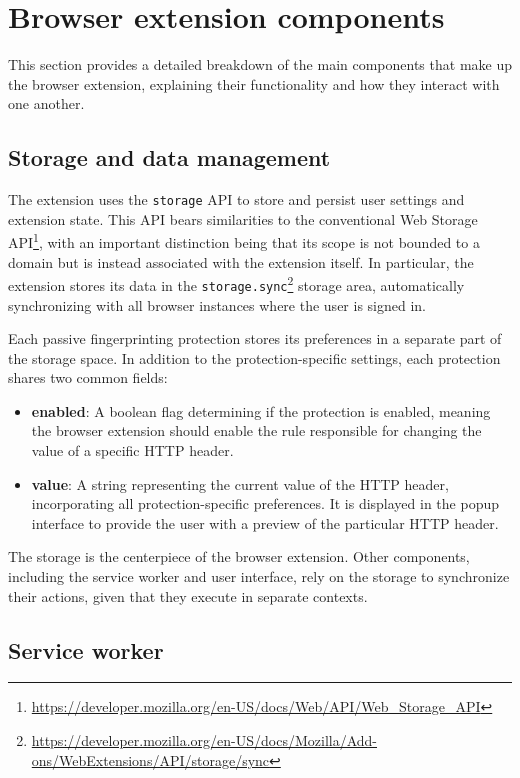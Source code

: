 \section{Browser extension components}

This section provides a detailed breakdown of the main components that make up the browser extension, explaining their functionality and how they interact with one another.

\subsection{Storage and data management}

The extension uses the \texttt{storage} API to store and persist user settings and extension state. This API bears similarities to the conventional Web Storage API\footnote{\url{https://developer.mozilla.org/en-US/docs/Web/API/Web_Storage_API}}, with an important distinction being that its scope is not bounded to a domain but is instead associated with the extension itself. In particular, the extension stores its data in the \texttt{storage.sync}\footnote{\url{https://developer.mozilla.org/en-US/docs/Mozilla/Add-ons/WebExtensions/API/storage/sync}} storage area, automatically synchronizing with all browser instances where the user is signed in.

Each passive fingerprinting protection stores its preferences in a separate part of the storage space. In addition to the protection-specific settings, each protection shares two common fields:

\begin{itemize}
	\item \textbf{enabled}: A boolean flag determining if the protection is enabled, meaning the browser extension should enable the rule responsible for changing the value of a specific HTTP header.
	\item \textbf{value}: A string representing the current value of the HTTP header, incorporating all protection-specific preferences. It is displayed in the popup interface to provide the user with a preview of the particular HTTP header.
\end{itemize}

The storage is the centerpiece of the browser extension. Other components, including the service worker and user interface, rely on the storage to synchronize their actions, given that they execute in separate contexts.

\subsection{Service worker}

